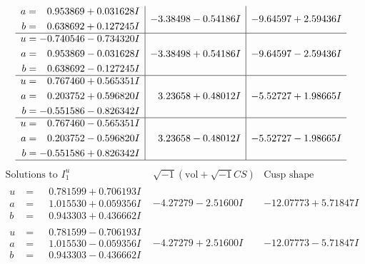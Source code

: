 \documentclass[1p]{elsarticle_modified}
\theoremstyle{definition}
\newcommand{\I}{\sqrt{-1}}
\begin{document}
$$\begin{array}{c|c|c}
\begin{aligned}
a &= \phantom{-}0.953869 + 0.031628 I \\
b &= \phantom{-}0.638692 + 0.127245 I\end{aligned}
 & -3.38498 - 0.54186 I & -9.64597 + 2.59436 I \\ \hline\begin{aligned}
u &= -0.740546 - 0.734320 I \\
a &= \phantom{-}0.953869 - 0.031628 I \\
b &= \phantom{-}0.638692 - 0.127245 I\end{aligned}
 & -3.38498 + 0.54186 I & -9.64597 - 2.59436 I \\ \hline\begin{aligned}
u &= \phantom{-}0.767460 + 0.565351 I \\
a &= \phantom{-}0.203752 + 0.596820 I \\
b &= -0.551586 - 0.826342 I\end{aligned}
 & \phantom{-}3.23658 + 0.48012 I & -5.52727 + 1.98665 I \\ \hline\begin{aligned}
u &= \phantom{-}0.767460 - 0.565351 I \\
a &= \phantom{-}0.203752 - 0.596820 I \\
b &= -0.551586 + 0.826342 I\end{aligned}
 & \phantom{-}3.23658 - 0.48012 I & -5.52727 - 1.98665 I\\
 \hline 
 \end{array}$$\newpage$$\begin{array}{c|c|c}  
\text{Solutions to }I^u_{1}& \I (\text{vol} + \sqrt{-1}CS) & \text{Cusp shape}\\
 \hline 
\begin{aligned}
u &= \phantom{-}0.781599 + 0.706193 I \\
a &= \phantom{-}1.015530 + 0.059356 I \\
b &= \phantom{-}0.943303 + 0.436662 I\end{aligned}
 & -4.27279 - 2.51600 I & -12.07773 + 5.71847 I \\ \hline\begin{aligned}
u &= \phantom{-}0.781599 - 0.706193 I \\
a &= \phantom{-}1.015530 - 0.059356 I \\
b &= \phantom{-}0.943303 - 0.436662 I\end{aligned}
 & -4.27279 + 2.51600 I & -12.07773 - 5.71847 I \\ \hline\begin{aligned}

\end{aligned}
\end{array}$$
\end{document}
